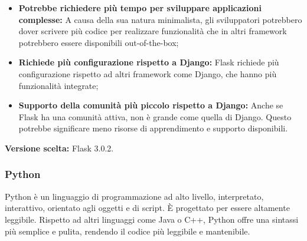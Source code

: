 \documentclass[10pt, a4paper]{article}
\begin{document}
\begin{itemize}
\begin{itemize}
\item \textbf{Potrebbe richiedere più tempo per sviluppare applicazioni complesse:} A causa della sua natura minimalista, gli sviluppatori potrebbero dover scrivere più codice per realizzare funzionalità che in altri framework potrebbero essere disponibili out-of-the-box;
\item \textbf{Richiede più configurazione rispetto a Django:} Flask richiede più configurazione rispetto ad altri framework come Django, che hanno più funzionalità integrate;
\item \textbf{Supporto della comunità più piccolo rispetto a Django:} Anche se Flask ha una comunità attiva, non è grande come quella di Django. Questo potrebbe significare meno risorse di apprendimento e supporto disponibili.
\end{itemize}
\end{itemize}
\textbf{Versione scelta:} Flask 3.0.2.

\subsubsection{Python}
Python è un linguaggio di programmazione ad alto livello, interpretato, interattivo, orientato agli oggetti e di script. È progettato per essere altamente leggibile. Rispetto ad altri linguaggi come Java o C++, Python offre una sintassi più semplice e pulita, rendendo il codice più leggibile e mantenibile.
\end{document}

